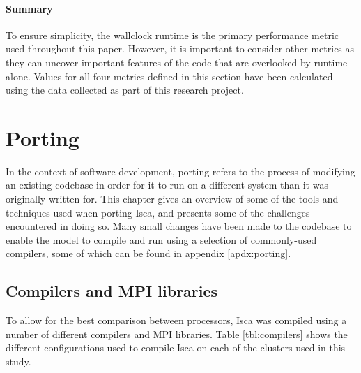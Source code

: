 \documentclass[a4paper,11pt]{report}
\begin{document}
\subsubsection{Summary}
To ensure simplicity, the wallclock runtime is the primary performance metric used throughout this paper. However, it is important to consider other metrics as they can uncover important features of the code that are overlooked by runtime alone. Values for all four metrics defined in this section have been calculated using the data collected as part of this research project. 




\let\textcircled=\pgftextcircled
\chapter{Porting}
\label{chap:baselineexp}
In the context of software development, porting refers to the process of modifying an existing codebase in order for it to run on a different system than it was originally written for. This chapter gives an overview of some of the tools and techniques used when porting Isca, and presents some of the challenges encountered in doing so. Many small changes have been made to the codebase to enable the model to compile and run using a selection of commonly-used compilers, some of which can be found in appendix \ref{apdx:porting}. 

\section{Compilers and MPI libraries}
To allow for the best comparison between processors, Isca was compiled using a number of different compilers and MPI libraries. Table \ref{tbl:compilers} shows the different configurations used to compile Isca on each of the clusters used in this study. 
\end{document}
